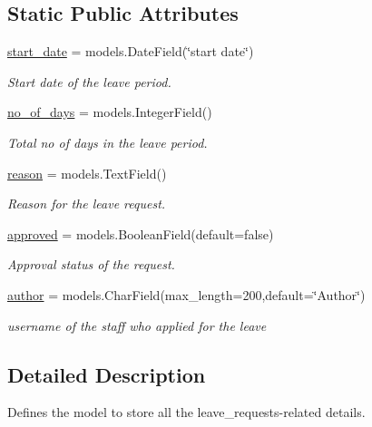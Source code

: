 \subsection*{Static Public Attributes}
\begin{DoxyCompactItemize}
\item 
\hyperlink{classmain_1_1models_1_1Leave_ad385bab40efa61e41021f8bdeccfbd4f}{start\+\_\+date} = models.\+Date\+Field(\char`\"{}start date\char`\"{})
\begin{DoxyCompactList}\small\item\em Start date of the leave period. \end{DoxyCompactList}\item 
\hyperlink{classmain_1_1models_1_1Leave_a99445fa4624f6668e3e881e0612ebd10}{no\+\_\+of\+\_\+days} = models.\+Integer\+Field()
\begin{DoxyCompactList}\small\item\em Total no of days in the leave period. \end{DoxyCompactList}\item 
\hyperlink{classmain_1_1models_1_1Leave_af65436e87a630c5d204bb91f8c0ccf01}{reason} = models.\+Text\+Field()
\begin{DoxyCompactList}\small\item\em Reason for the leave request. \end{DoxyCompactList}\item 
\hyperlink{classmain_1_1models_1_1Leave_a5a7ee37588c877c656b587b091051bf4}{approved} = models.\+Boolean\+Field(default=\textquotesingle{}false\textquotesingle{})
\begin{DoxyCompactList}\small\item\em Approval status of the request. \end{DoxyCompactList}\item 
\hyperlink{classmain_1_1models_1_1Leave_a062e4dd38d8e161c3b50a0b6cf7095f2}{author} = models.\+Char\+Field(max\+\_\+length=200,default=\char`\"{}Author\char`\"{})
\begin{DoxyCompactList}\small\item\em username of the staff who applied for the leave \end{DoxyCompactList}\end{DoxyCompactItemize}


\subsection{Detailed Description}
Defines the model to store all the leave\+\_\+requests-\/related details. 

